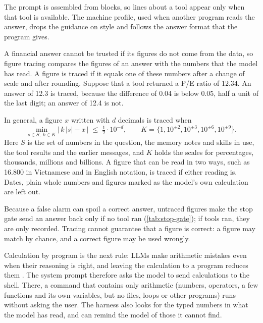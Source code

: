 The prompt is assembled from blocks, so lines about a tool appear only when that tool is available.
The machine profile, used when another program reads the answer, drops the guidance on style and follows the answer format that the program gives.

\label{sec:figure-tracing}
A financial answer cannot be trusted if its figures do not come from the data, so figure tracing compares the figures of an answer with the numbers that the model has read.
A figure is traced if it equals one of these numbers after a change of scale and after rounding.
Suppose that a tool returned a P/E ratio of 12.34.
An answer of 12.3 is traced, because the difference of 0.04 is below 0.05, half a unit of the last digit; an answer of 12.4 is not.

In general, a figure $x$ written with $d$ decimals is traced when
\begin{equation}\label{eq:tracing}
  \min_{s\in S,\;k\in K}\bigl|\,k\,|s|-x\,\bigr|\;\le\;\tfrac{1}{2}\cdot 10^{-d},
  \qquad K=\{1,10^{\pm2},10^{\pm3},10^{\pm6},10^{\pm9}\}.
\end{equation}
Here $S$ is the set of numbers in the question, the memory notes and skills in use, the tool results and the earlier messages, and $K$ holds the scales for percentages, thousands, millions and billions.
A figure that can be read in two ways, such as 16.800 in Vietnamese and in English notation, is traced if either reading is.
Dates, plain whole numbers and figures marked as the model's own calculation are left out.

Because a false alarm can spoil a correct answer, untraced figures make the stop gate send an answer back only if no tool ran (\cref{tab:stop-gate}); if tools ran, they are only recorded.
Tracing cannot guarantee that a figure is correct: a figure may match by chance, and a correct figure may be used wrongly.

Calculation by program is the next rule: LLMs make arithmetic mistakes even when their reasoning is right, and leaving the calculation to a program reduces them \parencite{gao2023pal}.
The system prompt therefore asks the model to send calculations to the shell.
There, a command that contains only arithmetic (numbers, operators, a few functions and its own variables, but no files, loops or other programs) runs without asking the user.
The harness also looks for the typed numbers in what the model has read, and can remind the model of those it cannot find.

